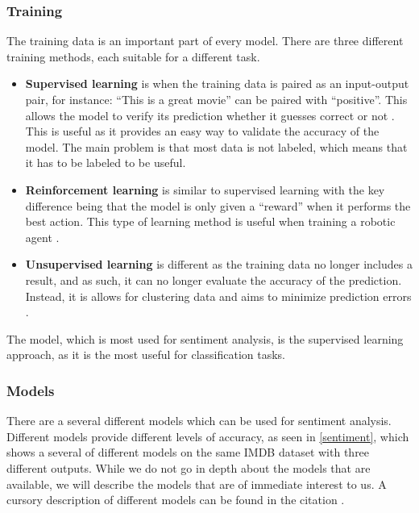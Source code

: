 \subsubsection{Training}
The training data is an important part of every model. There are three
different training methods, each suitable for a different task.

\begin{itemize}
  \item \textbf{Supervised learning} is when the training data is paired as an
  input-output pair, for instance: ``This is a great movie'' can be paired with
  ``positive''. This allows the model to verify its prediction whether it
  guesses correct or not \citep[Ch. 7.0]{MIBook}. This is useful as it provides
  an easy way to validate the accuracy of the model. The main problem is that
  most data is not labeled, which means that it has to be labeled to be useful.
  \item \textbf{Reinforcement learning} is similar to supervised learning with
  the key difference being that the model is only given a ``reward'' when it
  performs the best action. This type of learning method is useful when
  training a robotic agent \citep{Reinforcement}.
  \item \textbf{Unsupervised learning} is different as the training data no
  longer includes a result, and as such, it can no longer evaluate the accuracy
  of the prediction. Instead, it is allows for clustering data and aims to
  minimize prediction errors \citep[Ch. 11.1]{MIBook}.
\end{itemize}

The model, which is most used for sentiment analysis, is the supervised learning
approach, as it is the most useful for classification tasks.

\subsubsection{Models}\label{subsub:Models}

There are a several different models which can be used for sentiment analysis. 
Different models provide different levels of accuracy, as seen in
\autoref{sentiment}, which shows a several of different models on the same IMDB
dataset with three different outputs. While we do not go in depth about the
models that are available, we will describe the models that are of
immediate interest to us. A cursory description of different models can be
found in the citation \citep{Classification}.

